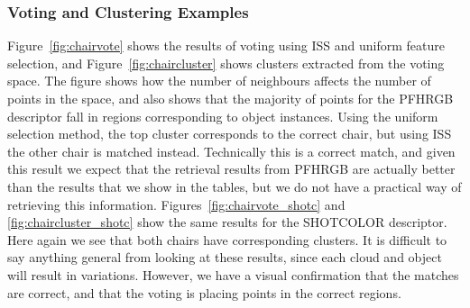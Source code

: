 \documentclass[11pt,a4paper]{kth-mag}
\begin{document}
\subsubsection{Voting and Clustering Examples}
Figure~\ref{fig:chairvote} shows the results of voting using ISS and uniform
feature selection, and Figure~\ref{fig:chaircluster} shows clusters extracted
from the voting space. The figure shows how the number of neighbours affects the
number of points in the space, and also shows that the majority of points for
the PFHRGB descriptor fall in regions corresponding to object instances. Using
the uniform selection method, the top cluster corresponds to the correct chair,
but using ISS the other chair is matched instead. Technically this is a correct
match, and given this result we expect that the retrieval results from PFHRGB
are actually better than the results that we show in the tables, but we do not
have a practical way of retrieving this information.
Figures~\ref{fig:chairvote_shotc} and \ref{fig:chaircluster_shotc} show the same
results for the SHOTCOLOR descriptor. Here again we see that both chairs have
corresponding clusters. It is difficult to say anything general from looking at
these results, since each cloud and object will result in variations. However,
we have a visual confirmation that the matches are correct, and that the voting
is placing points in the correct regions.
\newpage
\end{document}
